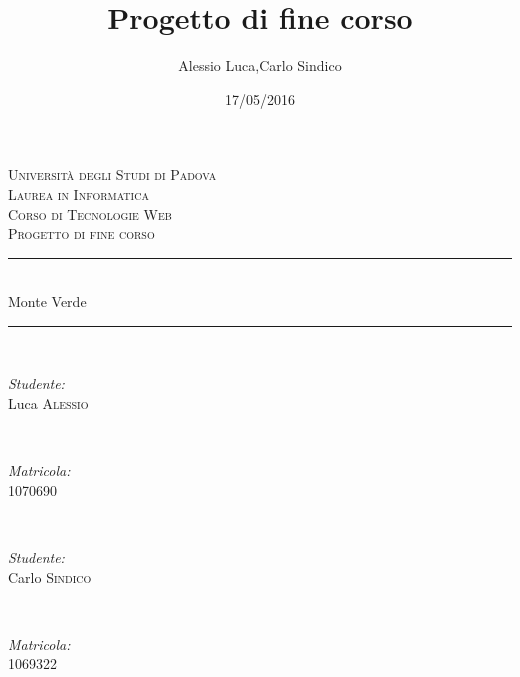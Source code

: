 \documentclass[12pt]{article}
\title{Progetto di fine corso}
\date{17/05/2016}
\author{Alessio Luca,Carlo Sindico}
\begin{document}
	
	\begin{titlepage}
		\newcommand{\HRule}{\rule{\linewidth}{0.5mm}}%
		\center
		
		\textsc{\LARGE Universit\`a degli Studi di Padova}\\[1.5cm] 
		\textsc{\Large Laurea in Informatica}\\[0.5cm]
		\textsc{\large Corso di Tecnologie Web}\\[0.5cm]
		\textsc{\large Progetto di fine corso}\\[0.5cm]
		
		
		\HRule \\[0.4cm]
		{ \huge  Monte Verde}\\[0.3cm] 
		\HRule \\[0.4cm]
		
		
		
		\begin{minipage}{0.3\textwidth}
			\begin{flushleft} \large
				\emph{Studente:}\\
				Luca \textsc{Alessio} %
			\end{flushleft}
		\end{minipage}
		~
		\begin{minipage}{0.3\textwidth}
			\begin{flushright} \large
				\emph{Matricola:} \\
				\textsc{1070690} %
			\end{flushright}
		\end{minipage}\\[1cm]
		
			\begin{minipage}{0.3\textwidth}
				\begin{flushleft} \large
					\emph{Studente:}\\
					Carlo \textsc{Sindico} %
				\end{flushleft}
			\end{minipage}
			~
			\begin{minipage}{0.3\textwidth}
				\begin{flushright} \large
					\emph{Matricola:} \\
					\textsc{1069322} %
				\end{flushright}
			\end{minipage}\\[1cm]
			

\end{titlepage}
\end{document}
